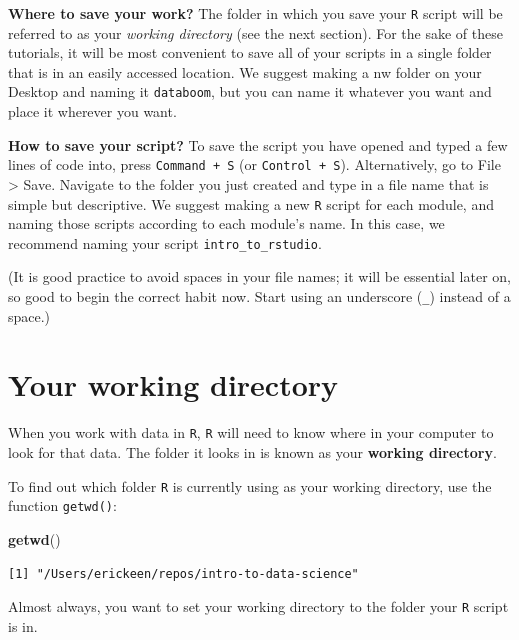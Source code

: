 \documentclass[
]{book}
\newenvironment{Shaded}{\begin{snugshade}}{\end{snugshade}}
\newcommand{\KeywordTok}[1]{\textcolor[rgb]{0.13,0.29,0.53}{\textbf{#1}}}
\newcommand{\NormalTok}[1]{#1}
\begin{document}
\textbf{Where to save your work?} The folder in which you save your \texttt{R} script will be referred to as your \emph{working directory} (see the next section). For the sake of these tutorials, it will be most convenient to save all of your scripts in a single folder that is in an easily accessed location. We suggest making a nw folder on your Desktop and naming it \texttt{databoom}, but you can name it whatever you want and place it wherever you want.

\textbf{How to save your script?} To save the script you have opened and typed a few lines of code into, press \texttt{Command\ +\ S} (or \texttt{Control\ +\ S}). Alternatively, go to File \textgreater{} Save. Navigate to the folder you just created and type in a file name that is simple but descriptive. We suggest making a new \texttt{R} script for each module, and naming those scripts according to each module's name. In this case, we recommend naming your script \texttt{intro\_to\_rstudio}.

(It is good practice to avoid spaces in your file names; it will be essential later on, so good to begin the correct habit now. Start using an underscore (\texttt{\_}) instead of a space.)

\hypertarget{your-working-directory}{%
\section*{Your working directory}\label{your-working-directory}}

When you work with data in \texttt{R}, \texttt{R} will need to know where in your computer to look for that data. The folder it looks in is known as your \textbf{working directory}.

To find out which folder \texttt{R} is currently using as your working directory, use the function \texttt{getwd()}:

\begin{Shaded}
\begin{Highlighting}[]
\KeywordTok{getwd}\NormalTok{()}
\end{Highlighting}
\end{Shaded}

\begin{verbatim}
[1] "/Users/erickeen/repos/intro-to-data-science"
\end{verbatim}

Almost always, you want to set your working directory to the folder your \texttt{R} script is in.
\end{document}
